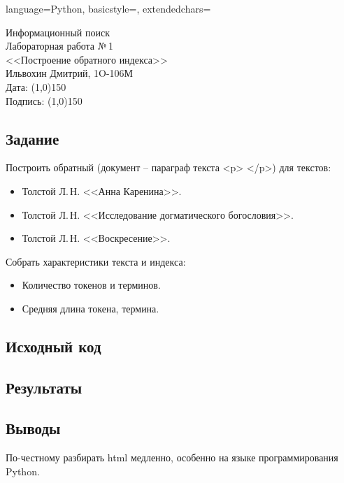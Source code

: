 \documentclass[12pt]{article}
\newcommand{\StudentName}{Ильвохин Дмитрий}
\newcommand{\Group}{1O-106М}
\newcommand{\CourseName}{Информационный поиск}
\newcommand{\LabNum}{1}
\newcommand{\Subject}{Построение обратного индекса}
\begin{document}
\lstset
{
        language=Python,
        basicstyle=\scriptsize,%
        extendedchars=\true
}

\begin{flushright}
\Large{
	\CourseName \\
	Лабораторная работа №\,\LabNum \\
	<<\Subject>> \\
  \StudentName, \Group \\
  Дата: \line(1,0){150} \\
  Подпись: \line(1,0){150} \\
}
\end{flushright}

\subsection*{Задание}
Построить обратный (документ -- параграф текста <p> </p>) для текстов:
\begin{itemize}
\item Толстой Л.\,Н. <<Анна Каренина>>.
\item Толстой Л.\,Н. <<Исследование догматического богословия>>.
\item Толстой Л.\,Н. <<Воскресение>>.
\end{itemize}

Собрать характеристики текста и индекса:
\begin{itemize}
\item Количество токенов и терминов.
\item Средняя длина токена, термина.
\end{itemize}

\subsection*{Исходный код}


\subsection*{Результаты}


\subsection*{Выводы}
По-честному разбирать html медленно, особенно на языке программирования Python.
\end{document}
